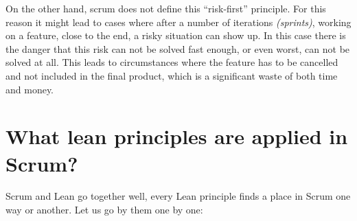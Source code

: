 On the other hand, \ac{scrum} does not define this ``risk-first'' principle. For this reason it might lead to cases where after a number of iterations \textit{(sprints)}, working on a feature, close to the end, a risky situation can show up. In this case there is the danger that this risk can not be solved fast enough, or even worst, can not be solved at all. This leads to circumstances where the feature has to be cancelled and not included in the final product, which is a significant waste of both time and money.

\section{What lean principles are applied in Scrum?}
Scrum and Lean go together well, every Lean principle finds a place in Scrum one way or another. Let us go by them one by one:

